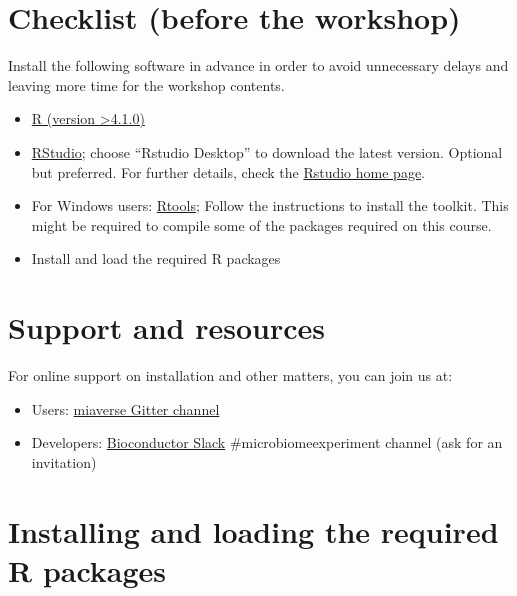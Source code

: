 \documentclass[
  oneside]{book}
\providecommand{\tightlist}{%
  \setlength{\itemsep}{0pt}\setlength{\parskip}{0pt}}
\begin{document}
\hypertarget{checklist-before-the-workshop}{%
\section{Checklist (before the workshop)}\label{checklist-before-the-workshop}}

Install the following software in advance in order to avoid
unnecessary delays and leaving more time for the workshop contents.

\begin{itemize}
\item
  \href{https://www.r-project.org/}{R (version \textgreater4.1.0)}
\item
  \href{https://www.rstudio.com/products/rstudio/download/}{RStudio};
  choose ``Rstudio Desktop'' to download the latest version. Optional
  but preferred. For further details, check the \href{https://www.rstudio.com/}{Rstudio home
  page}.
\item
  For Windows users: \href{https://cran.r-project.org/bin/windows/Rtools/rtools40.html}{Rtools};
  Follow the instructions to install the toolkit. This might be required to compile some of the
  packages required on this course.
\item
  Install and load the required R packages
\end{itemize}

\hypertarget{support-and-resources}{%
\section{Support and resources}\label{support-and-resources}}

For online support on installation and other matters, you can join us at:

\begin{itemize}
\tightlist
\item
  Users: \href{https://gitter.im/microbiome/miaverse?utm_source=badge\&utm_medium=badge\&utm_campaign=pr-badge\&utm_content=badge}{miaverse Gitter channel}
\item
  Developers: \href{https://bioc-community.herokuapp.com}{Bioconductor Slack} \#microbiomeexperiment channel (ask for an invitation)
\end{itemize}

\hypertarget{installing-and-loading-the-required-r-packages}{%
\section{Installing and loading the required R packages}\label{installing-and-loading-the-required-r-packages}}
\end{document}

